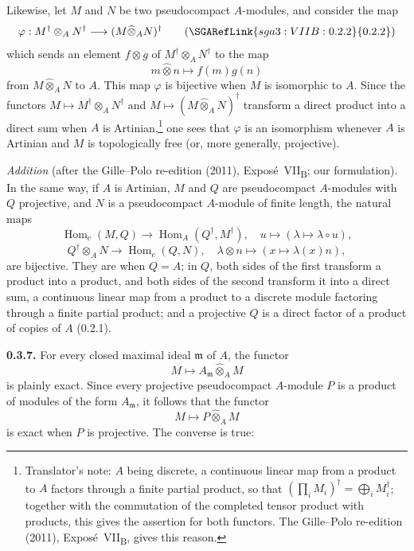 Likewise, let \(M\) and \(N\) be two pseudocompact \(A\)-modules, and
consider the map
\[
  \varphi:
  M^\dagger\otimes_A N^\dagger
  \longrightarrow
  (M\widehat{\otimes}_A N)^\dagger
  \qquad(\SGARefLink{sga3:VIIB:0.2.2}{0.2.2})
\]
which sends an element \(f\otimes g\) of \(M^\dagger\otimes_AN^\dagger\)
to the map
\[
  m\widehat{\otimes}n\longmapsto f(m)g(n)
\]
from \(M\widehat{\otimes}_A N\) to \(A\). This map \(\varphi\) is
bijective when \(M\) is isomorphic to \(A\). Since the functors
\(M\mapsto M^\dagger\otimes_A N^\dagger\) and
\(M\mapsto(M\widehat{\otimes}_A N)^\dagger\) transform a direct product
into a direct sum when \(A\) is Artinian,\footnote{Translator's note: \(A\) being discrete, a continuous
linear map from a product to \(A\) factors through a finite partial product, so that
\((\prod_iM_i)^\dagger=\bigoplus_iM_i^\dagger\); together with the commutation of the completed tensor
product with products, this gives the assertion for both functors. The Gille--Polo re-edition (2011),
Expos\'e~VII\textsubscript{B}, gives this reason.} one sees that \(\varphi\)
is an isomorphism whenever \(A\) is Artinian and \(M\) is topologically
free (or, more generally, projective).

\medskip\noindent
{}\label{sga3:VIIB:0.3.6.A}%
\emph{Addition} (after the Gille--Polo re-edition (2011), Expos\'e~VII\textsubscript{B}; our formulation).
In the same way, if \(A\) is Artinian, \(M\) and \(Q\) are pseudocompact \(A\)-modules with \(Q\)
projective, and \(N\) is a pseudocompact \(A\)-module of finite length, the natural maps
\[
  \operatorname{Hom}_c(M,Q)\longrightarrow\operatorname{Hom}_A(Q^\dagger,M^\dagger),
  \quad u\longmapsto(\lambda\mapsto\lambda\circ u),
\]
\[
  Q^\dagger\otimes_AN\longrightarrow\operatorname{Hom}_c(Q,N),
  \quad\lambda\otimes n\longmapsto(x\mapsto\lambda(x)n),
\]
are bijective. They are when \(Q=A\); in \(Q\), both sides of the first transform a product into a
product, and both sides of the second transform it into a direct sum, a continuous linear map from a
product to a discrete module factoring through a finite partial product; and a projective \(Q\) is a
direct factor of a product of copies of \(A\) (0.2.1).

\medskip
\noindent\textbf{0.3.7.}
\label{sga3:VIIB:0.3.7}
For every closed maximal ideal \(\mathfrak m\) of \(A\), the functor
\[
  M\longmapsto A_{\mathfrak m}\widehat{\otimes}_A M
\]
is plainly exact. Since every projective pseudocompact \(A\)-module
\(P\) is a product of modules of the form \(A_{\mathfrak m}\), it
follows that the functor
\[
  M\longmapsto P\widehat{\otimes}_A M
\]
is exact when \(P\) is projective. The converse is true:


